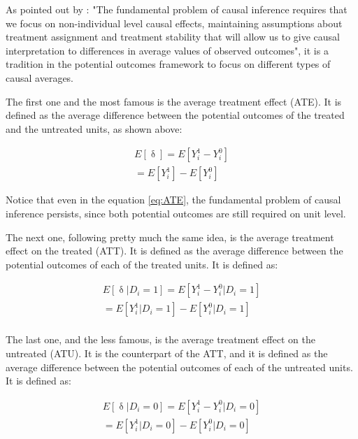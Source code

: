 As pointed out by \textcite{morgan_counterfactuals_2015} : "The fundamental problem of causal inference requires that we focus on non-individual
level causal effects, maintaining assumptions about treatment assignment and treatment stability that will allow us to give causal interpretation to
differences in average values of observed outcomes", it is a tradition in the potential outcomes framework to focus on different types of causal averages.

The first one and the most famous is the average treatment effect (\gls{ATE}). It is defined as the average difference between the potential outcomes of the treated and the untreated units, as shown above:

\begin{equation}
\begin{aligned}
E[\updelta] = E[Y_i^1 - Y_i^0] \\
= E[Y_i^1] - E[Y_i^0]
\label{eq:ATE}
\end{aligned}
\end{equation}

Notice that even in the equation \ref{eq:ATE}, the fundamental problem of causal inference persists, since both potential outcomes
are still required on unit level. 

The next one, following pretty much the same idea, is the average treatment effect on the treated (\gls{ATT}). It is defined as the average difference 
between the potential outcomes of each of the treated units. It is defined as:

\begin{equation}
\begin{aligned}
E[\updelta|D_i = 1] = E[Y_i^1 - Y_i^0|D_i = 1] \\
= E[Y_i^1|D_i = 1] - E[Y_i^0|D_i = 1] \\
\label{eq:ATT}
\end{aligned}
\end{equation}

The last one, and the less famous, is the average treatment effect on the untreated (\gls{ATU}). It is the counterpart of the \gls{ATT}, and it is defined as the average difference
between the potential outcomes of each of the untreated units. It is defined as:

\begin{equation}
\begin{aligned}
E[\updelta|D_i = 0] = E[Y_i^1 - Y_i^0|D_i = 0] \\
= E[Y_i^1|D_i = 0] - E[Y_i^0|D_i = 0]
\label{eq:ATU}
\end{aligned}
\end{equation}

